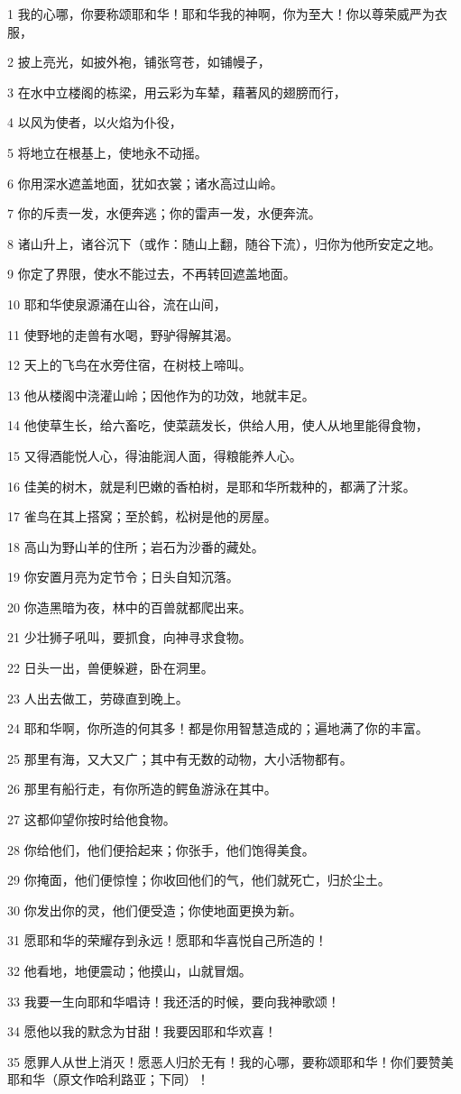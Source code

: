 \par 1 我的心哪，你要称颂耶和华！耶和华我的神啊，你为至大！你以尊荣威严为衣服，
\par 2 披上亮光，如披外袍，铺张穹苍，如铺幔子，
\par 3 在水中立楼阁的栋梁，用云彩为车辇，藉著风的翅膀而行，
\par 4 以风为使者，以火焰为仆役，
\par 5 将地立在根基上，使地永不动摇。
\par 6 你用深水遮盖地面，犹如衣裳；诸水高过山岭。
\par 7 你的斥责一发，水便奔逃；你的雷声一发，水便奔流。
\par 8 诸山升上，诸谷沉下（或作：随山上翻，随谷下流），归你为他所安定之地。
\par 9 你定了界限，使水不能过去，不再转回遮盖地面。
\par 10 耶和华使泉源涌在山谷，流在山间，
\par 11 使野地的走兽有水喝，野驴得解其渴。
\par 12 天上的飞鸟在水旁住宿，在树枝上啼叫。
\par 13 他从楼阁中浇灌山岭；因他作为的功效，地就丰足。
\par 14 他使草生长，给六畜吃，使菜蔬发长，供给人用，使人从地里能得食物，
\par 15 又得酒能悦人心，得油能润人面，得粮能养人心。
\par 16 佳美的树木，就是利巴嫩的香柏树，是耶和华所栽种的，都满了汁浆。
\par 17 雀鸟在其上搭窝；至於鹤，松树是他的房屋。
\par 18 高山为野山羊的住所；岩石为沙番的藏处。
\par 19 你安置月亮为定节令；日头自知沉落。
\par 20 你造黑暗为夜，林中的百兽就都爬出来。
\par 21 少壮狮子吼叫，要抓食，向神寻求食物。
\par 22 日头一出，兽便躲避，卧在洞里。
\par 23 人出去做工，劳碌直到晚上。
\par 24 耶和华啊，你所造的何其多！都是你用智慧造成的；遍地满了你的丰富。
\par 25 那里有海，又大又广；其中有无数的动物，大小活物都有。
\par 26 那里有船行走，有你所造的鳄鱼游泳在其中。
\par 27 这都仰望你按时给他食物。
\par 28 你给他们，他们便拾起来；你张手，他们饱得美食。
\par 29 你掩面，他们便惊惶；你收回他们的气，他们就死亡，归於尘土。
\par 30 你发出你的灵，他们便受造；你使地面更换为新。
\par 31 愿耶和华的荣耀存到永远！愿耶和华喜悦自己所造的！
\par 32 他看地，地便震动；他摸山，山就冒烟。
\par 33 我要一生向耶和华唱诗！我还活的时候，要向我神歌颂！
\par 34 愿他以我的默念为甘甜！我要因耶和华欢喜！
\par 35 愿罪人从世上消灭！愿恶人归於无有！我的心哪，要称颂耶和华！你们要赞美耶和华（原文作哈利路亚；下同）！

